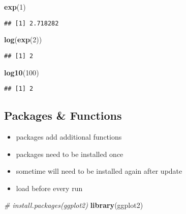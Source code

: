 \documentclass[
  a4paper,
]{article}
\newenvironment{Shaded}{\begin{snugshade}}{\end{snugshade}}
\newcommand{\CommentTok}[1]{\textcolor[rgb]{0.56,0.35,0.01}{\textit{#1}}}
\newcommand{\DecValTok}[1]{\textcolor[rgb]{0.00,0.00,0.81}{#1}}
\newcommand{\FunctionTok}[1]{\textcolor[rgb]{0.13,0.29,0.53}{\textbf{#1}}}
\newcommand{\NormalTok}[1]{#1}
\providecommand{\tightlist}{%
  \setlength{\itemsep}{0pt}\setlength{\parskip}{0pt}}
\begin{document}
\begin{Shaded}
\begin{Highlighting}[]
\FunctionTok{exp}\NormalTok{(}\DecValTok{1}\NormalTok{)}
\end{Highlighting}
\end{Shaded}

\begin{verbatim}
## [1] 2.718282
\end{verbatim}

\begin{Shaded}
\begin{Highlighting}[]
\FunctionTok{log}\NormalTok{(}\FunctionTok{exp}\NormalTok{(}\DecValTok{2}\NormalTok{))}
\end{Highlighting}
\end{Shaded}

\begin{verbatim}
## [1] 2
\end{verbatim}

\begin{Shaded}
\begin{Highlighting}[]
\FunctionTok{log10}\NormalTok{(}\DecValTok{100}\NormalTok{)}
\end{Highlighting}
\end{Shaded}

\begin{verbatim}
## [1] 2
\end{verbatim}

\subsection{Packages \& Functions}\label{packages-functions}

\begin{itemize}
\tightlist
\item
  packages add additional functions
\item
  packages need to be installed once
\item
  sometime will need to be installed again after update
\item
  load before every run
\end{itemize}

\begin{Shaded}
\begin{Highlighting}[]
\CommentTok{\# install.packages(\textquotesingle{}ggplot2\textquotesingle{})}
\FunctionTok{library}\NormalTok{(ggplot2)}
\end{Highlighting}
\end{Shaded}
\end{document}
